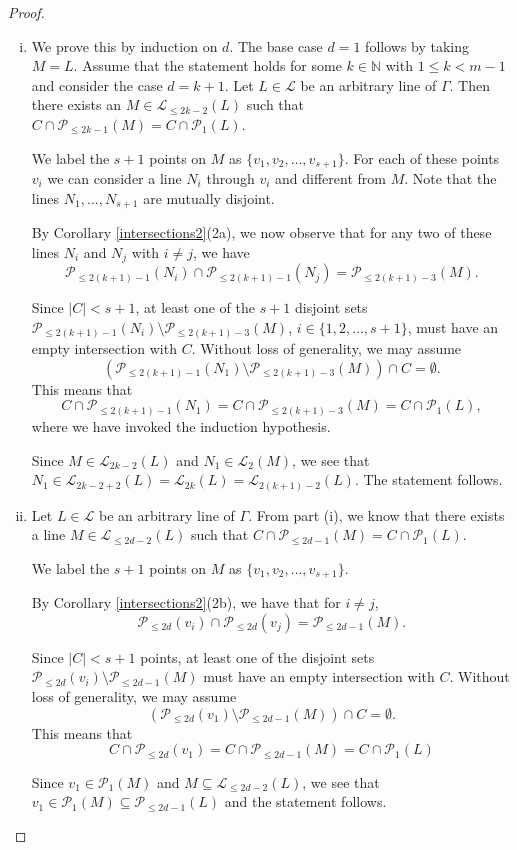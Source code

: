 \documentclass[10pt,a4paper]{amsart}
\newcommand{\Lines}{\mathcal{L}}
\newcommand{\N}{\mathbb{N}}
\newcommand{\Points}{\mathcal{P}}
\begin{document}
\begin{proof}
	\(\)
	\begin{enumerate}[(i)]
		\item We prove this by induction on \(d\). The base case \(d=1\) follows by taking $M=L$.
		Assume that the statement holds for some \(k\in \N\) with \(1\le k < m-1\) and consider the case \(d=k+1\). 
		Let \(L\in\Lines\) be an arbitrary line of \(\Gamma\). Then there exists an \(M\in \Lines_{\le 2k-2}(L)\) such that \(C\cap \Points_{\le2k-1}(M) = C\cap \Points_{1}(L)\). 
		
		We label the \(s+1\) points on \(M\) as \(\{v_1,v_2,\dots,v_{s+1}\}\). For each of these points \(v_i\) we can consider a line \(N_i\) through \(v_i\) and different from \(M\). Note that the lines $N_1,\ldots,N_{s+1}$ are mutually disjoint.
		
		By Corollary \ref{intersections2}(2a), we now observe that for any two of these lines \(N_i\) and \(N_j\) with \(i\neq j\), we have \[\Points_{\le 2(k+1)-1}(N_i)\cap \Points_{\le 2(k+1)-1}(N_j)= \Points_{\le 2(k+1)-3}(M).\]
		
		Since  \(|C|<s+1\), at least one of the $s+1$ disjoint sets \(\Points_{\le 2(k+1)-1}(N_i)\setminus \Points_{\le 2(k+1)-3}(M) \), $i \in \{1,2,\ldots,s+1\}$, must have an empty intersection with \(C\). Without loss of generality, we may assume 
		\[(\Points_{\le 2(k+1)-1}(N_1)\setminus \Points_{\le 2(k+1)-3}(M)) \cap C = \emptyset.\]
		This means that 
		\[C\cap \Points_{\le2(k+1)-1}(N_1) = C\cap \Points_{\le2(k+1)-3}(M) = C\cap \Points_{1}(L),\]
		 where we have invoked the induction hypothesis.
         
		Since \(M\in \Lines_{2k-2}(L)\) and \(N_1\in\Lines_{2}(M)\),  we see that \(N_1\in   \Lines_{2k-2+2}(L)=\Lines_{2k}(L)=\Lines_{2(k+1)-2}(L)\). The statement follows.
		
		\item Let \(L\in\Lines\) be an arbitrary line of \(\Gamma\). 
		From part (i), we know that there exists a line \(M\in \Lines_{\le 2d-2}(L)\) such that \(C\cap \Points_{\le2d-1}(M) = C\cap \Points_{1}(L)\).
		
		We label the \(s+1\) points on \(M\) as \(\{v_1,v_2,\dots,v_{s+1}\}\). 

		By Corollary \ref{intersections2}(2b), we have that for \(i\neq j\),  \[\Points_{\le 2d}(v_i)\cap \Points_{\le 2d}(v_j)= \Points_{\le 2d-1}(M).\]
		
		Since \(|C|<s+1\) points, at least one of the disjoint  sets \(\Points_{\le 2d}(v_i)\setminus \Points_{\le 2d-1}(M) \) must have an empty intersection with \(C\). Without loss of generality, we may assume 
		\[(\Points_{\le 2d}(v_1)\setminus \Points_{\le 2d-1}(M)) \cap C = \emptyset.\]
		This means that 
		\[C\cap \Points_{\le2d}(v_1) = C\cap \Points_{\le2d-1}(M) = C\cap \Points_{1}(L)\]
		
		Since $v_1\in \Points_1(M)$ and $M\subseteq \Lines_{\leq 2d-2}(L)$, we see that \(v_1\in \Points_{1}(M) \subseteq \Points_{\leq 2d-1}(L)\) and the statement follows.\qedhere
	\end{enumerate}
\end{proof}
\end{document}
